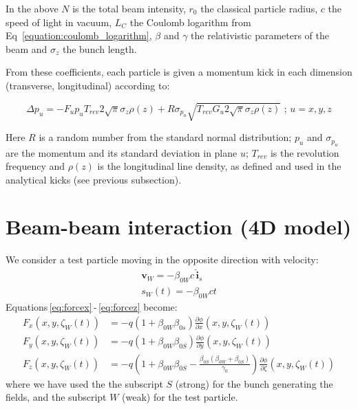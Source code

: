 In the above \(N\) is the total beam intensity, \(r_0\) the classical particle radius, \(c\) the speed of light in vacuum, \(L_C\) the Coulomb logarithm from Eq~\eqref{equation:coulomb_logarithm}, \(\beta\) and \(\gamma\) the relativistic parameters of the beam and \(\sigma_z\) the bunch length.
\newline

From these coefficients, each particle is given a momentum kick in each dimension (transverse, longitudinal) according to:

\begin{equation}
    \boxed{\Delta p_u = - F_u p_u T_{rev} 2 \sqrt{\pi} \sigma_z \rho(z) + R \sigma_{p_u} \sqrt{T_{rev} G_u 2 \sqrt{\pi} \sigma_z \rho(z)} \text{ ;   } u=x,y,z}
    \label{equation:momentum_kick_kinetic}
\end{equation}

Here \(R\) is a random number from the standard normal distribution; \(p_u\) and \(\sigma_{p_u}\) are the momentum and its standard deviation in plane \(u\); \(T_{rev}\) is the revolution frequency and \(\rho(z)\) is the longitudinal line density, as defined and used in the analytical kicks (see previous subsection).

\section{Beam-beam interaction (4D model)}

We consider a test particle moving in the opposite direction with velocity:
\begin{align}
\textbf{v}_W = -\beta_{0W} c\, \hat{\textbf{i}}_s\\
s_W(t) = -\beta_{0W} ct
\end{align}
Equations\,\eqref{eq:forcex}\,-\,\eqref{eq:forcez} become:
\begin{align}
F_x(x, y, \zeta_W(t)) &=  -q(1+\beta_{0W}  \beta_{0s}) \frac{\partial \phi}{\partial x}(x, y, \zeta_W(t)) \label{eq:bbfgenx}\\
F_y(x, y, \zeta_W(t)) &=  -q(1+\beta_{0W}  \beta_{0S}) \frac{\partial \phi}{\partial y}(x, y, \zeta_W(t))\label{eq:bbfgeny}\\
F_z(x, y, \zeta_W(t)) &=  -q\left(1+\beta_{0W}  \beta_{0S} -\frac{\beta_{0S}(\beta_{0W}+\beta_{0S})}{\gamma_0}\right) \frac{\partial \phi}{\partial \zeta}(x, y, \zeta_W(t))\label{eq:bbfgenz}
\end{align}
where we have used the the subscript $S$ (strong) for the bunch generating the fields, and the subscript $W$ (weak) for the test particle. 

